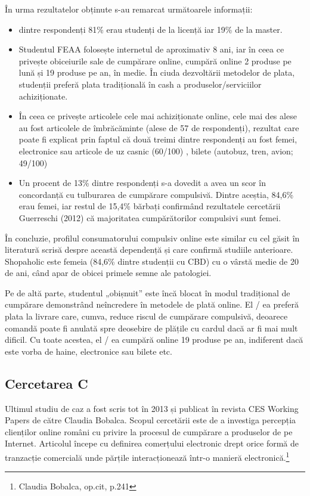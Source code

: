 \documentclass[a4paper, 12pt]{article}
\begin{document}
	\quad În urma rezultatelor obținute s-au remarcat următoarele informații: 
		\begin{itemize}
	\item dintre respondenți 81\% erau studenți de la licență iar 19\% de la master. 
	\item Studentul FEAA folosește internetul de aproximativ 8 ani, iar în ceea ce privește obiceiurile sale de cumpărare online, cumpără online 2 produse pe lună și 19 produse pe an, în medie. În ciuda dezvoltării metodelor de plata, studenții preferă plata tradițională în cash a produselor/serviciilor achiziționate.
	\item În ceea ce privește articolele cele mai achiziționate online, cele mai des alese au fost articolele de îmbrăcăminte (alese de 57 de respondenți), rezultat care poate fi explicat prin faptul că două treimi dintre respondenți au fost femei, electronice sau articole de uz casnic (60/100) , bilete (autobuz, tren, avion; 49/100)
	\item Un procent de 13\% dintre respondenți s-a dovedit a avea un scor în concordanță cu tulburarea de cumpărare compulsivă. Dintre aceștia, 84,6\% erau femei, iar restul de 15,4\% bărbați confirmând rezultatele cercetării Guerreschi (2012) că majoritatea cumpărătorilor compulsivi sunt femei.
\end{itemize}
		\qquad În concluzie, profilul consumatorului compulsiv online este similar cu cel găsit în literatură scrisă despre această dependență și care confirmă studiile anterioare. Shopaholic este femeia (84,6\% dintre studenții cu CBD) cu o vârstă medie de 20 de ani, când apar de obicei primele semne ale patologiei.
		
		\quad Pe de altă parte, studentul „obișnuit” este încă blocat în modul tradițional de cumpărare demonstrând neîncredere în metodele de plată online. El / ea preferă plata la livrare care, cumva,  reduce riscul de cumpărare compulsivă, deoarece comandă poate fi anulată spre deosebire de plățile cu cardul dacă ar fi mai mult dificil. Cu toate acestea, el / ea cumpără online 19 produse pe an, indiferent dacă este vorba de haine, electronice sau bilete etc.
		\subsection{Cercetarea C}
		\qquad Ultimul studiu de caz  a fost scris tot în 2013 și publicat în revista CES Working Papers de către Claudia Bobalca. Scopul cercetării este de a investiga percepția clienților online români cu privire la procesul de cumpărare a produselor de pe Internet. Articolul începe cu definirea comerțului electronic drept orice formă de tranzacție comercială unde părțile interacționează într-o manieră electronică.\footnote{Claudia Bobalca, op.cit, p.241}
		
\end{document}
